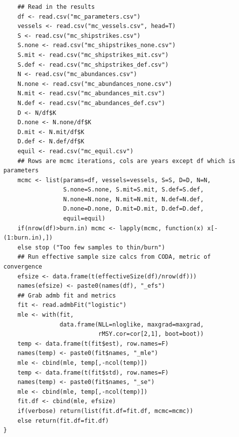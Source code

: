 \documentclass{article}
\begin{document}
\begin{verbatim}
    ## Read in the results
    df <- read.csv("mc_parameters.csv")
    vessels <- read.csv("mc_vessels.csv", head=T)
    S <- read.csv("mc_shipstrikes.csv")
    S.none <- read.csv("mc_shipstrikes_none.csv")
    S.mit <- read.csv("mc_shipstrikes_mit.csv")
    S.def <- read.csv("mc_shipstrikes_def.csv")
    N <- read.csv("mc_abundances.csv")
    N.none <- read.csv("mc_abundances_none.csv")
    N.mit <- read.csv("mc_abundances_mit.csv")
    N.def <- read.csv("mc_abundances_def.csv")
    D <- N/df$K
    D.none <- N.none/df$K
    D.mit <- N.mit/df$K
    D.def <- N.def/df$K
    equil <- read.csv("mc_equil.csv")
    ## Rows are mcmc iterations, cols are years except df which is parameters
    mcmc <- list(params=df, vessels=vessels, S=S, D=D, N=N,
                 S.none=S.none, S.mit=S.mit, S.def=S.def,
                 N.none=N.none, N.mit=N.mit, N.def=N.def,
                 D.none=D.none, D.mit=D.mit, D.def=D.def,
                 equil=equil)
    if(nrow(df)>burn.in) mcmc <- lapply(mcmc, function(x) x[-(1:burn.in),])
    else stop ("Too few samples to thin/burn")
    ## Run effective sample size calcs from CODA, metric of convergence
    efsize <- data.frame(t(effectiveSize(df)/nrow(df)))
    names(efsize) <- paste0(names(df), "_efs")
    ## Grab admb fit and metrics
    fit <- read.admbFit("logistic")
    mle <- with(fit,
                data.frame(NLL=nloglike, maxgrad=maxgrad,
                           rMSY.cor=cor[2,1], boot=boot))
    temp <- data.frame(t(fit$est), row.names=F)
    names(temp) <- paste0(fit$names, "_mle")
    mle <- cbind(mle, temp[,-ncol(temp)])
    temp <- data.frame(t(fit$std), row.names=F)
    names(temp) <- paste0(fit$names, "_se")
    mle <- cbind(mle, temp[,-ncol(temp)])
    fit.df <- cbind(mle, efsize)
    if(verbose) return(list(fit.df=fit.df, mcmc=mcmc))
    else return(fit.df=fit.df)
}
\end{verbatim}
\end{document}
